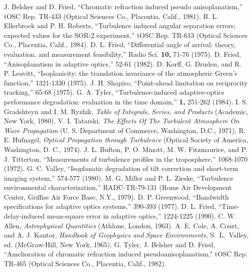 \begin{references}
  J. Belsher and D. Fried, ``Chromatic refraction
induced pseudo  anisoplanatism,'' tOSC Rep. TR-433 (Optical
Sciences Co.,  Placentia, Calif., 1981).
  B. L. Ellerbroek and P. H. Roberts,  ``Turbulence
induced angular separation errors; expected values for the  SOR-2
experiment,'' tOSC Rep.  TR-613 (Optical Sciences Co.,  Placentia,
Calif., 1984).
  D. L. Fried, ``Differential angle of  arrival: theory,
evaluation, and measurement feasibility,'' Radio  Sci. {\bf 10,}
71-76 (1975).
  D. Fried, ``Anisoplanatism in adaptive  optics,''
 52-61 (1982).    D. Korff, G. Druden,
and  R. P. Leavitt, ``Isoplanicity: the translation invariance of
the  atmospheric Green's function,''  1321-1330
(1975).
   J. H. Shapiro, ``Point-ahead limitation on
reciprocity tracking,''   65-68 (1975).
  G. A. Tyler, ``Turbulence-induced  adaptive-optics
performance degradation: evaluation in the time domain,''  \josaa
{\bf  1,} 251-262 (1984).
  I. S. Gradshteyn and I. M.  Ryzhik, {\it Table of
Integrals, Series, and Products}  (Academic, New York, 1980).
  V. I. Tatarski, {\it The Effects Of The Turbulent
Atmosphere  On Wave Propagation} (U. S. Department of Commerce,
Washington, D.C., 1971).
  R. E.  Hufnagel, {\it Optical Propagation through
Turbulence} (Optical Society of America, Washington, D. C., 1974).
   J. L. Bufton, P. O. Minott, M. W. Fitzmaurice, and
P. J. Titterton,  ``Measurements of turbulence profiles in the
troposphere,''    1068-1070 (1972).
  G. C. Valley, ``Isoplanatic degradation of tilt
correction and short-term imaging system,''  574-577
(1980).
  M. G. Miller and P. L. Zieske, ``Turbulence
environmental  characterization,'' RADC-TR-79-131 (Rome Air
Development Center,  Griffiss Air Force Base, N.Y., 1979).
  D. P. Greenwood, ``Bandwidth specifications for
adaptive optics  systems,''  390-393 (1977).
  D. L. Fried, ``Time-delay-induced mean-square error
in adaptive optics,''  1224-1225 (1990).
  C. W. Allen, {\it Astrophysical Quantities}
(Athlone, London, 1963).
  A. E. Cole, A. Court, and A. J. Kantor,  {\it
Handbook  of Geophysics and Space Environments,} S.\ L.\ Valley,
ed.  (McGraw-Hill, New York, 1965).
  G. Tyler, J.  Belsher and D. Fried, ``Amelioration of
chromatic refraction induced  pseudoanisoplanatism," tOSC Rep.
TR-465 (Optical Sciences  Co., Placentia, Calif., 1982).
\end{references}

